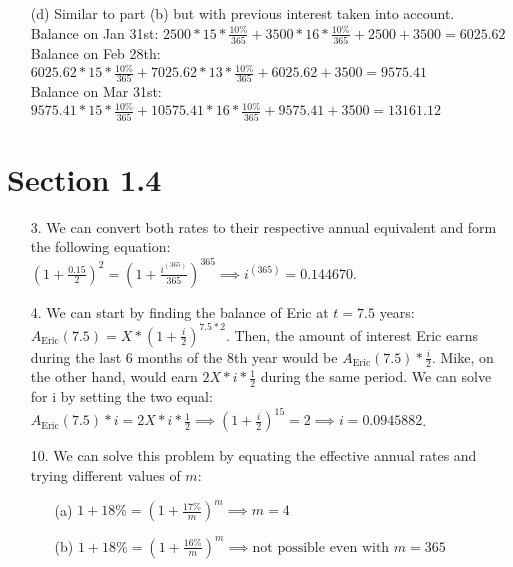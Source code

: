 \documentclass{article}
\begin{document}
\begin{itemize}
\begin{itemize}
                  \item [(d)]
                        Similar to part (b) but with previous interest taken into account.\\
                        Balance on Jan 31st: $2500*15*\frac{10\%}{365}+3500*16*\frac{10\%}{365}+2500+3500=6025.62$\\
                        Balance on Feb 28th: $6025.62*15*\frac{10\%}{365}+7025.62*13*\frac{10\%}{365}+6025.62+3500=9575.41$\\
                        Balance on Mar 31st: $9575.41*15*\frac{10\%}{365}+10575.41*16*\frac{10\%}{365}+9575.41+3500=\boxed{13161.12}$
            \end{itemize}
\end{itemize}

\section*{Section 1.4}
\begin{itemize}
      \item [3.]
            We can convert both rates to their respective annual equivalent and form the following equation:\\
            $(1+\frac{0.15}{2})^2=(1+\frac{i^{(365)}}{365})^{365} \implies \boxed{i^{(365)}=0.144670}$.
      \item [4.]
            We can start by finding the balance of Eric at $t=7.5$ years: $A_{\text{Eric}}(7.5)=X*(1+\frac{i}{2})^{7.5*2}$. Then, the amount of interest Eric earns during the last 6 months of the 8th year would be $A_{\text{Eric}}(7.5)*\frac{i}{2}$. Mike, on the other hand, would earn $2X*i*\frac{1}{2}$ during the same period. We can solve for i by setting the two equal: $A_{\text{Eric}}(7.5)*i=2X*i*\frac{1}{2} \implies (1+\frac{i}{2})^{15}=2 \implies \boxed{i=0.0945882}$.
      \item [10.]
            We can solve this problem by equating the effective annual rates and trying different values of $m$:
            \begin{itemize}
                  \item [(a)] $1+18\%=(1+\frac{17\%}{m})^m \implies \boxed{m=4}$
                  \item [(b)] $1+18\%=(1+\frac{16\%}{m})^m \implies \boxed{\text{not possible}} \text{ even with } m=365$
            \end{itemize}
\end{itemize}
\end{document}
